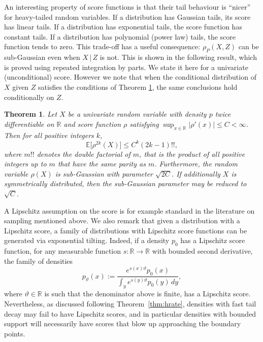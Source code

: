 \documentclass[aos]{imsart}
\newcommand{\R}{\mathbb{R}}
\newcommand{\E}{\mathbb{E}}
\newcommand{\given}{\,|\,}
\newtheorem{theorem}{Theorem}
\begin{document}
	An interesting property of score functions is that their tail behaviour is ``nicer'' for heavy-tailed random variables. If a distribution has Gaussian tails, its score has linear tails. If a distribution has exponential tails, the score function has constant tails. If a distribution has polynomial (power law) tails, the score function tends to zero. This trade-off has a useful consequence: $\rho_P(X,Z)$ can be sub-Gaussian even when $X\given  Z$ is not. This is shown in the following result, which is proved using repeated integration by parts. We state it here for a univariate (unconditional) score. However we note that when the conditional distribution of $X$ given $Z$ satisfies the conditions of Theorem \ref{thm:scoresubg}, the same conclusions hold conditionally on $Z$.
	\begin{theorem}
		\label{thm:scoresubg}
		Let $X$ be a univariate random variable with density $p$ twice differentiable on $\R$ and score function $\rho$ satisfying $\sup_{x\in\R} |\rho'(x)| \leq C<\infty$. Then for all positive integers $k$, \begin{equation*}
			\E\big[\rho^{2k}(X)\big] \leq C^k (2k-1)!!,
		\end{equation*}
		where $m!!$ denotes the double factorial of $m$, that is the product of all positive integers up to $m$ that have the same parity as $m$. Furthermore,  the random variable $\rho(X)$ is sub-Gaussian with parameter $\sqrt{2C}$. If additionally $X$ is symmetrically distributed, then the sub-Gaussian parameter may be reduced to $\sqrt{C}$.
	\end{theorem}
	A Lipschitz assumption on the score is for example standard in the literature on sampling mentioned above. We also remark that given a distribution with a Lipschitz score, a family of distributions with Lipschitz score functions can  be generated via exponential tilting. Indeed, if a density $p_0$ has a Lipschitz score function, for any measurable function $s:\R \to \R$ with bounded second derivative, the family of densities
	\[
	p_{\vartheta} (x) := \frac{e^{s(x)\vartheta}p_0(x)}{\int_y e^{s(y)\vartheta}p_0(y) \, dy},
	\]
	where $\vartheta \in \R$ is such that the denominator above is finite, has a Lipschitz score.
	Nevertheless, as discussed following Theorem~\ref{thm:hrate}, densities with fast tail decay may fail to have Lipschitz scores, and in particular densities with bounded support will necessarily have scores that blow up approaching the boundary points.
	
\end{document}
